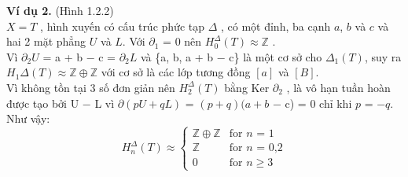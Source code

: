 \textbf{Ví dụ 2.} (Hình 1.2.2) \\
\indent \(X = T\) , hình xuyến có cấu trúc phức tạp \(\Delta\) , có một đỉnh, ba cạnh \(a\), \(b\) và \(c\) và hai 2 mặt phẳng \(U\) và \(L\). Với \(\partial_1\) = 0 nên \(H_0^{\Delta} (T) \approx \mathds{Z}\) . \\
Vì \(\partial_2U\) = a + b − c = \(\partial_2L\) và \{a, b, a + b − c\} là một cơ sở cho \(\Delta_1(T)\), suy ra \\
\(H_1\Delta(T) \approx  \mathds{Z} \oplus \mathds{Z}\) với cơ sở là các lớp tương đồng \([a]\) và \([B]\). \\
Vì không tồn tại 3 số đơn giản nên \(H_2^{\Delta}(T)\) bằng Ker \(\partial_2\) , là vô hạn tuần hoàn được tạo bởi U − L vì \(\partial(pU + qL)\) = \((p + q)(a + b\) − c) = 0 chỉ khi \(p\) = −\(q\). Như vậy:
\[H_n^{\Delta}(T) \approx \begin{cases}
	\mathds{Z} \oplus \mathds{Z} & \text{for $n$ = 1}\\
	\mathds{Z} & \text{for $n$ = 0,2} \\
	0 & \text{for $n$} \geq 3
\end{cases} 
\] \\